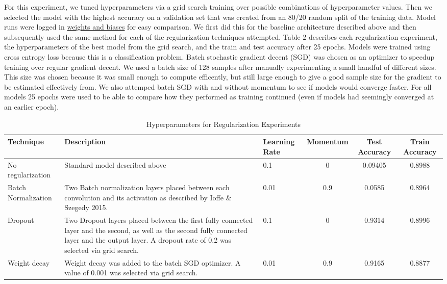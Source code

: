 \documentclass{article}
\begin{document}
For this experiment, we tuned hyperparameters via a grid search training over possible combinations of hyperparameter values. Then we selected the model with the highest accuracy on a validation set that was created from an 80/20 random split of the training data. Model runs were logged in \href{https://api.wandb.ai/links/mitkrieger-cornell-university/dcihajq4}{weights and biases} for easy comparison. We first did this for the baseline architecture described above and then subsequently used the same method for each of the regularization techniques attempted. Table 2 describes each regularization experiment, the hyperparameters of the best model from the grid search, and the train and test accuracy after 25 epochs. Models were trained using cross entropy loss because this is a classification problem. Batch stochastic gradient decent (SGD) was chosen as an optimizer to speedup training over regular gradient decent. We used a batch size of 128 samples after manually experimenting a small handful of different sizes. This size was chosen because it was small enough to compute efficently, but still large enough to give a good sample size for the gradient to be estimated effectively from. We also attemped batch SGD with and without momentum to see if models would converge faster. For all models 25 epochs were used to be able to compare how they performed as training continued (even if models had seemingly converged at an earlier epoch).

\begin{table}[ht]
    \centering
    \caption{Hyperparameters for Regularization Experiments}
    \label{tab:lenet5}
    \begin{tabular}{|p{2cm}|p{3cm}|p{2cm}|c|c|c|}
        \hline
        \textbf{Technique}      & \textbf{Description}  & \textbf{Learning Rate}    & \textbf{Momentum}  & \textbf{Test Accuracy} & \textbf{Train Accuracy}\\
        \hline
        \raggedright No regularization       & \raggedright Standard model described above                     & 0.1                       & 0  & 0.09405 & 0.8988\\
        \hline
        \raggedright Batch Normalization     & \raggedright Two Batch normalization layers placed between each convolution and its activation as described by Ioffe \& Szegedy 2015.                  & 0.01                      & 0.9  & 0.0585 & 0.8964 \\
        \hline
        \raggedright Dropout                 & \raggedright Two Dropout layers placed between the first fully connected layer and the second, as well as the second fully connected layer and the output layer. A dropout rate of 0.2 was selected via grid search.                 & 0.1                      & 0  &0.9314 & 0.8996\\
        \hline
        \raggedright Weight decay            & \raggedright Weight decay was added to the batch SGD optimizer. A value of 0.001 was selected via grid search.                  & 0.01                      & 0.9 & 0.9165 & 0.8877\\
        \hline
    \end{tabular}
\end{table}
\end{document}
